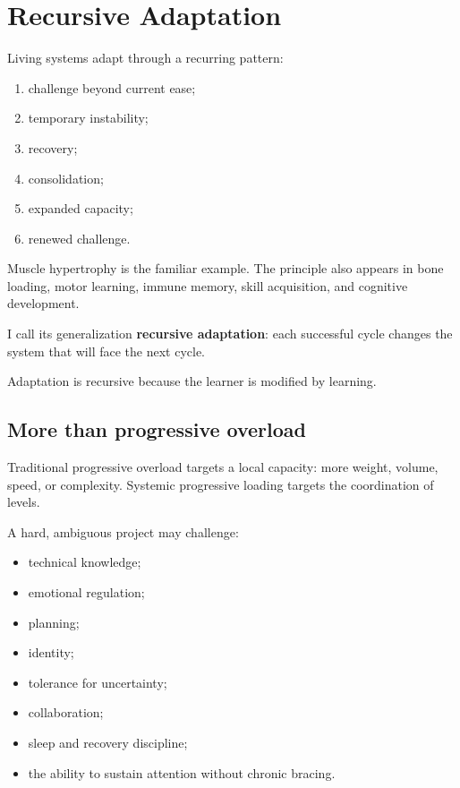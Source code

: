 \chapter{Recursive Adaptation}

Living systems adapt through a recurring pattern:

\begin{enumerate}
\def\labelenumi{\arabic{enumi}.}
\tightlist
\item
  challenge beyond current ease;
\item
  temporary instability;
\item
  recovery;
\item
  consolidation;
\item
  expanded capacity;
\item
  renewed challenge.
\end{enumerate}

Muscle hypertrophy is the familiar example. The principle also appears in bone loading, motor learning, immune memory, skill acquisition, and cognitive development.

I call its generalization \textbf{recursive adaptation}: each successful cycle changes the system that will face the next cycle.

Adaptation is recursive because the learner is modified by learning.

\section{More than progressive overload}

Traditional progressive overload targets a local capacity: more weight, volume, speed, or complexity. Systemic progressive loading targets the coordination of levels.

A hard, ambiguous project may challenge:

\begin{itemize}
\tightlist
\item
  technical knowledge;
\item
  emotional regulation;
\item
  planning;
\item
  identity;
\item
  tolerance for uncertainty;
\item
  collaboration;
\item
  sleep and recovery discipline;
\item
  the ability to sustain attention without chronic bracing.
\end{itemize}

